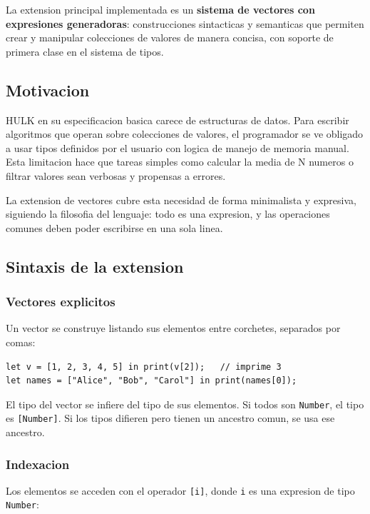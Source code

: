 \documentclass[12pt,a4paper]{article}
\begin{document}
La extension principal implementada es un \textbf{sistema de vectores con expresiones
generadoras}: construcciones sintacticas y semanticas que permiten crear y manipular
colecciones de valores de manera concisa, con soporte de primera clase en el sistema
de tipos.

\subsection{Motivacion}

HULK en su especificacion basica carece de estructuras de datos. Para escribir
algoritmos que operan sobre colecciones de valores, el programador se ve obligado a
usar tipos definidos por el usuario con logica de manejo de memoria manual. Esta
limitacion hace que tareas simples como calcular la media de N numeros o filtrar
valores sean verbosas y propensas a errores.

La extension de vectores cubre esta necesidad de forma minimalista y expresiva, siguiendo
la filosofia del lenguaje: todo es una expresion, y las operaciones comunes deben
poder escribirse en una sola linea.

\subsection{Sintaxis de la extension}

\subsubsection{Vectores explicitos}

Un vector se construye listando sus elementos entre corchetes, separados por comas:

\begin{lstlisting}[caption={Vector explicito con tipo inferido}]
let v = [1, 2, 3, 4, 5] in print(v[2]);   // imprime 3
let names = ["Alice", "Bob", "Carol"] in print(names[0]);
\end{lstlisting}

El tipo del vector se infiere del tipo de sus elementos. Si todos son \texttt{Number},
el tipo es \texttt{[Number]}. Si los tipos difieren pero tienen un ancestro comun, se
usa ese ancestro.

\subsubsection{Indexacion}

Los elementos se acceden con el operador \texttt{[i]}, donde \texttt{i} es una
expresion de tipo \texttt{Number}:
\end{document}
